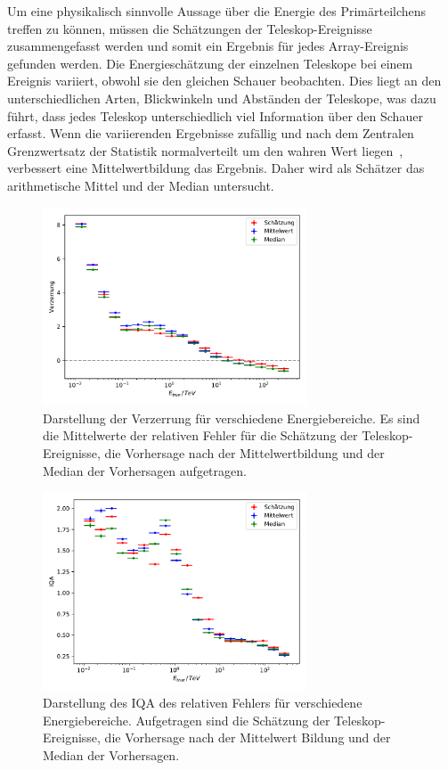 Um eine physikalisch sinnvolle Aussage über die Energie des Primärteilchens treffen zu können, müssen die Schätzungen der
Teleskop-Ereignisse zusammengefasst werden und somit ein Ergebnis für jedes Array-Ereignis gefunden werden.
Die Energieschätzung der einzelnen Teleskope bei einem Ereignis variiert, obwohl sie den gleichen Schauer beobachten.
Dies liegt an den unterschiedlichen Arten, Blickwinkeln und Abständen der Teleskope, was dazu führt, dass jedes Teleskop unterschiedlich viel Information über den
Schauer erfasst.
Wenn die variierenden Ergebnisse zufällig und nach dem Zentralen Grenzwertsatz der Statistik normalverteilt um den
wahren Wert liegen~\cite[10]{zufall_Fehler}, verbessert eine Mittelwertbildung das Ergebnis.
Daher wird als Schätzer das arithmetische Mittel und der Median untersucht.
\begin{figure}
  \includegraphics[width=0.7\textwidth]{Plots/RF_mean_bias.pdf}
  \centering
  \caption{Darstellung der Verzerrung für verschiedene Energiebereiche. Es sind die Mittelwerte der relativen Fehler für die Schätzung der Teleskop-Ereignisse, die Vorhersage
          nach der Mittelwertbildung und der Median der Vorhersagen aufgetragen.}
  \label{abb:mean_median_bias}
\end{figure}
\begin{figure}
  \includegraphics[width=0.7\textwidth]{Plots/RF_mean_resolution.pdf}
  \centering
  \caption{Darstellung des IQA des relativen Fehlers für verschiedene Energiebereiche. Aufgetragen sind die Schätzung der Teleskop-Ereignisse, die Vorhersage
          nach der Mittelwert Bildung und der Median der Vorhersagen.}
  \label{abb:mean_median_IQA}
\end{figure}

